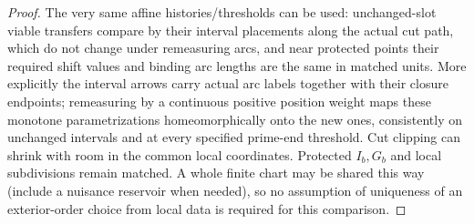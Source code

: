 \begin{proof}
The very same affine histories/thresholds can
be used: unchanged-slot viable transfers compare by their interval placements along the actual cut path,
which do not change under remeasuring arcs, and near protected points their required shift values and
binding arc lengths are the same in matched units. More explicitly the interval arrows carry actual arc
labels together with their closure endpoints; remeasuring by a continuous positive position weight maps
these monotone parametrizations homeomorphically onto the new ones, consistently on unchanged intervals and
at every specified prime-end threshold. Cut clipping can shrink with room in the common local coordinates.
Protected \(I_b,G_b\) and local subdivisions remain matched. A whole finite chart may be shared this way
(include a nuisance reservoir when needed), so no assumption of uniqueness of an exterior-order choice from
local data is required for this comparison.

\end{proof}

